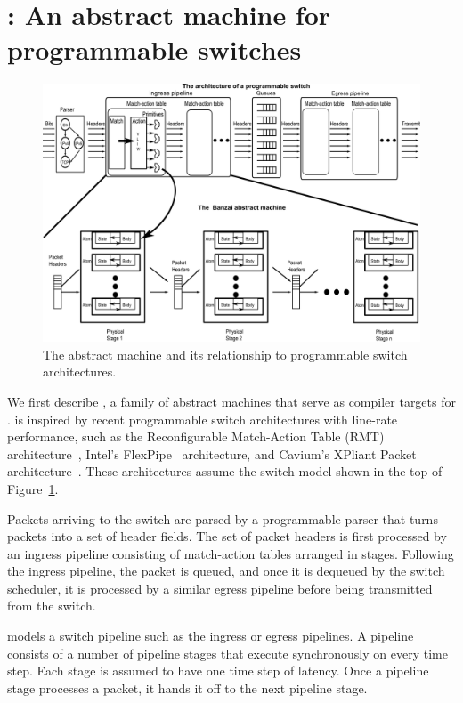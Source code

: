 \section{\absmachine: An abstract machine for programmable switches}
\label{s:absmachine}

\begin{figure}[!t]
  \includegraphics[width=\textwidth]{banzai.pdf}
  \caption{The \absmachine abstract machine and its relationship to
  programmable switch architectures.}
  \label{fig:switch}
\end{figure}

We first describe \absmachine, a family of abstract machines that serve as
compiler targets for \pktlanguage. \absmachine is inspired by recent
programmable switch architectures with line-rate performance, such as the
Reconfigurable Match-Action Table (RMT) architecture~\cite{rmt}, Intel's
FlexPipe~\cite{flexpipe} architecture, and Cavium's XPliant Packet
architecture~\cite{xpliant}. These architectures assume the switch model shown
in the top of Figure~\ref{fig:switch}.

Packets arriving to the switch are parsed by a programmable parser that turns
packets into a set of header fields. The set of packet headers is first
processed by an ingress pipeline consisting of match-action tables arranged in
stages. Following the ingress pipeline, the packet is queued, and once it is
dequeued by the switch scheduler, it is processed by a similar egress pipeline
before being transmitted from the switch.

\absmachine models a switch pipeline such as the ingress or egress
pipelines. A pipeline consists of a number of pipeline stages that
execute synchronously on every time step. Each stage is assumed to
have one time step of latency. Once a pipeline stage processes a
packet, it hands it off to the next pipeline stage.

